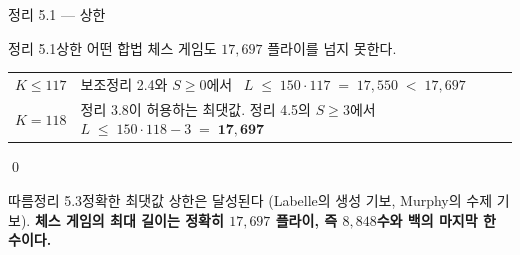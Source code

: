 \documentclass[aspectratio=169,10pt]{beamer}
\begin{document}
\begin{frame}{정리 5.1 --- 상한}
  \centering
  \vspace{0.4cm}
  \begin{lcthm}{정리 5.1}{상한}
    \centering 어떤 합법 체스 게임도 $17{,}697$ 플라이를 넘지 못한다.
  \end{lcthm}
  \vspace{0.3cm}
  \begin{lcproof}
    {\small
    \begin{tabular}{@{}ll@{}}
      $K \le 117$ & 보조정리 2.4와 $S \ge 0$에서 \
                    $L \;\le\; 150 \cdot 117 \;=\; 17{,}550 \;<\; 17{,}697$ \\[5pt]
      $K = 118$   & 정리 3.8이 허용하는 최댓값. 정리 4.5의 $S \ge 3$에서 \
                    $L \;\le\; 150 \cdot 118 - 3 \;=\; \mathbf{17{,}697}$ \\
    \end{tabular}\par\medskip
    \hfill\qed}
  \end{lcproof}
  \vspace{0.3cm}
  \begin{lcthm}{따름정리 5.3}{정확한 최댓값}
    \centering
    {\small 상한은 달성된다 (Labelle의 생성 기보, Murphy의 수제 기보).
    \textbf{체스 게임의 최대 길이는 정확히 $17{,}697$ 플라이,
    즉 $8{,}848$수와 백의 마지막 한 수이다.}}
  \end{lcthm}
\end{frame}
\end{document}
